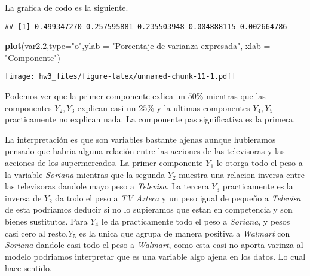 \documentclass[]{article}
\newenvironment{Shaded}{\begin{snugshade}}{\end{snugshade}}
\newcommand{\DataTypeTok}[1]{\textcolor[rgb]{0.13,0.29,0.53}{#1}}
\newcommand{\FloatTok}[1]{\textcolor[rgb]{0.00,0.00,0.81}{#1}}
\newcommand{\KeywordTok}[1]{\textcolor[rgb]{0.13,0.29,0.53}{\textbf{#1}}}
\newcommand{\NormalTok}[1]{#1}
\newcommand{\OperatorTok}[1]{\textcolor[rgb]{0.81,0.36,0.00}{\textbf{#1}}}
\newcommand{\StringTok}[1]{\textcolor[rgb]{0.31,0.60,0.02}{#1}}
\begin{document}
La grafica de codo es la siguiente.

\begin{Shaded}
\end{Shaded}

\begin{verbatim}
## [1] 0.499347270 0.257595881 0.235503948 0.004888115 0.002664786
\end{verbatim}

\begin{Shaded}
\begin{Highlighting}[]
\KeywordTok{plot}\NormalTok{(var2}\FloatTok{.2}\NormalTok{,}\DataTypeTok{type=}\StringTok{"o"}\NormalTok{,}\DataTypeTok{ylab =} \StringTok{"Porcentaje de varianza expresada"}\NormalTok{, }\DataTypeTok{xlab =} \StringTok{"Componente"}\NormalTok{)}
\end{Highlighting}
\end{Shaded}

\texttt{[image: hw3\_files/figure-latex/unnamed-chunk-11-1.pdf]}

Podemos ver que la primer componente exlica un \(50\%\) mientras que las
componentes \(Y_{2},Y_{3}\) explican casi un \(25\%\) y la ultimas
componentes \(Y_{4},Y_{5}\) practicamente no explican nada. La
componente pas significativa es la primera.

La interpretación es que son variables bastante ajenas aunque hubieramos
pensado que habria alguna relación entre las acciones de las televisoras
y las acciones de los supermercados. La primer componente \(Y_{1}\) le
otorga todo el peso a la variable \emph{Soriana} mientras que la segunda
\(Y_{2}\) muestra una relacion inversa entre las televisoras dandole
mayo peso a \emph{Televisa}. La tercera \(Y_3\) practicamente es la
inversa de \(Y_{2}\) da todo el peso a \emph{TV Azteca} y un peso igual
de pequeño a \emph{Televisa} de esta podriamos deducir si no lo
supieramos que estan en competencia y son bienes sustitutos. Para
\(Y_4\) le da practicamente todo el peso a \emph{Soriana}, y pesos casi
cero al resto.\(Y_5\) es la unica que agrupa de manera positiva a
\emph{Walmart} con \emph{Soriana} dandole casi todo el peso a
\emph{Walmart}, como esta casi no aporta varinza al modelo podriamos
interpretar que es una variable algo ajena en los datos. Lo cual hace
sentido.
\end{document}
